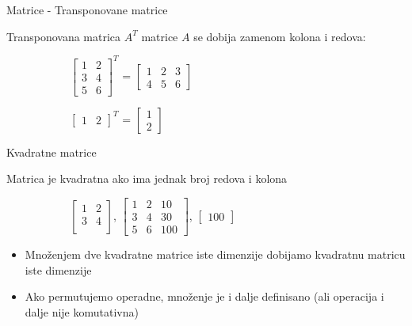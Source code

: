 \documentclass[bookmarks=true,bookmarksopen=true,pdfborder={0 0 0},pdfhighlight={/N},linkbordercolor={.5 .5 .5},implicit=false,unicode,xcolor={table}]{beamer}
\begin{document}
\begin{frame}{Matrice - Transponovane matrice}

  Transponovana matrica $A^{T}$ matrice $A$ se dobija zamenom kolona i redova:
  \begin{figure}
    \begin{subfigure}{9cm}
      $\begin{bmatrix}
        1 & 2\\
        3 & 4\\
        5 & 6
        \end{bmatrix}^{T}$
      =
      $\begin{bmatrix}
        1 & 2 & 3\\
        4 & 5 & 6
        \end{bmatrix}$
    \end{subfigure}
  \end{figure}

  \begin{figure}
    \begin{subfigure}{9cm}
      $\begin{bmatrix}
        1 & 2
        \end{bmatrix}^{T}$
      =
      $\begin{bmatrix}
        1\\
        2
        \end{bmatrix}$
    \end{subfigure}
  \end{figure}

\end{frame}

\begin{frame}{Kvadratne matrice}

  Matrica je kvadratna ako ima jednak broj redova i kolona
  \begin{figure}
    \begin{subfigure}{9cm}
      $\begin{bmatrix}
        1 & 2\\
        3 & 4\\
        \end{bmatrix}$,
        $\begin{bmatrix}
          1 & 2 & 10\\
          3 & 4 & 30\\
          5 & 6 & 100
          \end{bmatrix}$,
        $\begin{bmatrix}
          100
          \end{bmatrix}$
    \end{subfigure}
  \end{figure}
  \begin{itemize}
    \item Množenjem dve kvadratne matrice iste dimenzije dobijamo kvadratnu matricu iste dimenzije
    \item Ako permutujemo operadne, množenje je i dalje definisano (ali operacija i dalje nije komutativna)
  \end{itemize}

\end{frame}
\end{document}
